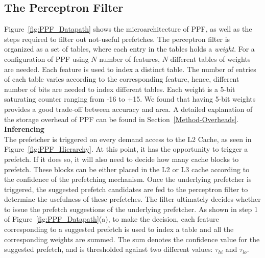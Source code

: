 \subsection{The Perceptron Filter}
\label{Arch-Perceptron}

Figure~\ref{fig:PPF_Datapath} shows the microarchitecture of PPF, as
well as the steps required to filter out not-useful prefetches. The
perceptron filter is organized as a set of tables, where each entry in
the tables holds a \textit{weight}.  For a configuration of PPF using
$N$ number of features, $N$ different tables of weights are needed.
Each feature is used to index a distinct table. The number of entries
of each table varies according to the corresponding feature, hence,
different number of bits are needed to index different tables. Each
weight is a 5-bit saturating counter ranging from -16 to +15. We found
that having 5-bit weights provides a good trade-off between accuracy
and area. A detailed explanation of the storage overhead of PPF can
be found in Section~\ref{Method-Overheads}.
%
\newline
\newline
\noindent \textbf{Inferencing}\\
The {prefetcher} is triggered on every demand access to the L2
Cache, as seen in Figure~\ref{fig:PPF_Hierarchy}.  At this point, 
it has the opportunity to trigger a prefetch.
If it does so, it will also need to decide how many cache blocks to
prefetch.  These blocks can be either placed in the L2 or L3 cache
according to the confidence of the prefetching mechanism.  Once the
{underlying} prefetcher is triggered, the suggested prefetch candidates are
fed to the perceptron filter to determine the usefulness of these
prefetches. The filter ultimately decides whether to issue the
prefetch suggestions of the {underlying} prefetcher. As shown in step 1
of Figure~\ref{fig:PPF_Datapath}(a), to make the decision,
each feature corresponding to a suggested prefetch is used to index a
table and all the corresponding weights are summed. The sum denotes
the confidence value for the suggested prefetch, and is thresholded
against two different values: $\tau_{hi}$ and $\tau_{lo}$.

